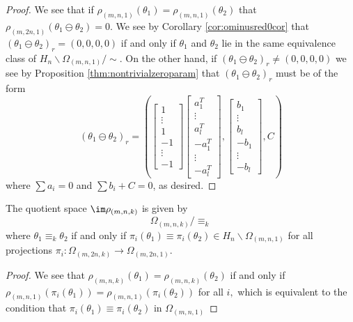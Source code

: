 \documentclass[11pt,letterpaper]{amsart}
\begin{document}
\begin{proof}
    We see that if $\rho_{(m,n,1)}(\theta_1)=\rho_{(m,n,1)}(\theta_2)$ that $\rho_{(m, 2n, 1)}(\theta_1\ominus\theta_2)=0$. We see by Corollary \ref{cor:ominusred0cor} that $(\theta_1\ominus\theta_2)_r=(0,0,0,0)$ if and only if $\theta_1$ and $\theta_2$ lie in the same equivalence class of $H_n\backslash \Omega_{(m,n,1)}/\sim$. On the other hand, if $(\theta_1\ominus\theta_2)_r\neq(0,0,0,0)$ we see by Proposition \ref{thm:nontrivialzeroparam} that $(\theta_1\ominus\theta_2)_r$ must be of the form
    $$
    (\theta_1\ominus\theta_2)_r = \left(\begin{bmatrix}
        1\\
        \vdots\\
        1\\
        -1\\
        \vdots\\
        -1
    \end{bmatrix}
    \begin{bmatrix}
        a_1^T\\
        \vdots\\
        a_l^T\\
        -a_{1}^T\\
        \vdots\\
        -a_{l}^T
    \end{bmatrix}, \begin{bmatrix}
        b_1\\
        \vdots\\
        b_l\\
        -b_1\\
        \vdots\\
        -b_l
    \end{bmatrix}, C
    \right)
    $$
    where $\sum a_i = 0$ and $\sum b_i + C = 0$, as desired. 
\end{proof}
\begin{theorem}\label{thm:symmetryclassification}
    The quotient space $\im \rho_{(m,n,k)}$ is given by
    $$
    \Omega_{(m,n,k)}/\equiv_k
    $$
    where $\theta_1\equiv_k \theta_2$ if and only if $\pi_i(\theta_1)\equiv \pi_i(\theta_2)\in H_n\backslash\Omega_{(m,n,1)}$ for all projections $\pi_i:\Omega_{(m,2n,k)}\rightarrow \Omega_{(m,2n,1)}$.
\end{theorem}
\begin{proof}
    We see that $\rho_{(m,n,k)}(\theta_1)=\rho_{(m,n,k)}(\theta_2)$ if and only if $\rho_{(m,n,1)}(\pi_i(\theta_1))=\rho_{(m,n,1)}(\pi_i(\theta_2))$ for all $i,$ which is equivalent to the condition that $\pi_i(\theta_1)\equiv \pi_i(\theta_2)$ in $\Omega_{(m,n,1)}$ 
\end{proof}
\end{document}
